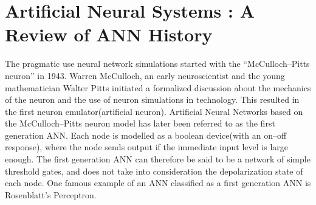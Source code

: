 





\section{Artificial Neural Systems : A Review of ANN History}
	\label{ssecHistoryOfANN}
	The pragmatic use neural network simulations started with the ``McCulloch--Pitts neuron'' in 1943.
	Warren McCulloch, an early neuroscientist and the young mathematician Walter Pitts initiated a formalized discussion about the mechanics of the neuron and the use of neuron simulations in technology. %
	This resulted in the first neuron emulator(artificial neuron). %
%
	Artificial Neural Networks based on the McCulloch--Pitts neuron model has later been referred to as the first generation ANN\cite{Maass97networksof}.
	Each node is modelled as a boolean device(with an on--off response), where the node sends output if the immediate input level is large enough.
	The first generation ANN can therefore be said to be a network of simple threshold gates, %
		and does not take into consideration the depolarization state of each node. %
	One famous example of an ANN classified as a first generation ANN is Rosenblatt's Perceptron\cite{HaykinANNbok}.

